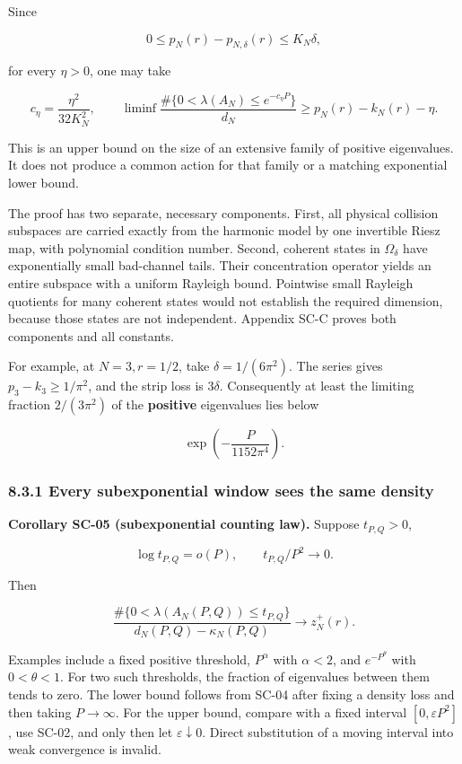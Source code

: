 Since

\[
0\leq p_N(r)-p_{N,\delta}(r)\leq K_N\delta,
\]

for every \(\eta>0\), one may take

\[
c_\eta=\frac{\eta^2}{32K_N^2},\qquad
\liminf\frac{\#\{0<\lambda(A_N)\leq e^{-c_\eta P}\}}{d_N}
\geq p_N(r)-k_N(r)-\eta.
\]

This is an upper bound on the size of an extensive family of positive eigenvalues. It does not produce a common action for that family or a matching exponential lower bound.

The proof has two separate, necessary components. First, all physical collision subspaces are carried exactly from the harmonic model by one invertible Riesz map, with polynomial condition number. Second, coherent states in \(\Omega_\delta\) have exponentially small bad-channel tails. Their concentration operator yields an entire subspace with a uniform Rayleigh bound. Pointwise small Rayleigh quotients for many coherent states would not establish the required dimension, because those states are not independent. Appendix SC-C proves both components and all constants.

For example, at \(N=3,r=1/2\), take \(\delta=1/(6\pi^2)\). The series gives \(p_3-k_3\geq1/\pi^2\), and the strip loss is \(3\delta\). Consequently at least the limiting fraction \(2/(3\pi^2)\) of the \textbf{positive} eigenvalues lies below

\[
\exp\!\left(-\frac{P}{1152\pi^4}\right).
\]

\hypertarget{every-subexponential-window-sees-the-same-density}{%
\subsubsection{8.3.1 Every subexponential window sees the same density}\label{every-subexponential-window-sees-the-same-density}}

\textbf{Corollary SC-05 (subexponential counting law).} Suppose \(t_{P,Q}>0\),

\[
\log t_{P,Q}=o(P),\qquad t_{P,Q}/P^2\longrightarrow0.
\]

Then

\[
\frac{\#\{0<\lambda(A_N(P,Q))\leq t_{P,Q}\}}
{d_N(P,Q)-\kappa_N(P,Q)}\longrightarrow z_N^+(r).
\]

Examples include a fixed positive threshold, \(P^\alpha\) with \(\alpha<2\), and \(e^{-P^\theta}\) with \(0<\theta<1\). For two such thresholds, the fraction of eigenvalues between them tends to zero. The lower bound follows from SC-04 after fixing a density loss and then taking \(P\to\infty\). For the upper bound, compare with a fixed interval \([0,\varepsilon P^2]\), use SC-02, and only then let \(\varepsilon\downarrow0\). Direct substitution of a moving interval into weak convergence is invalid.


